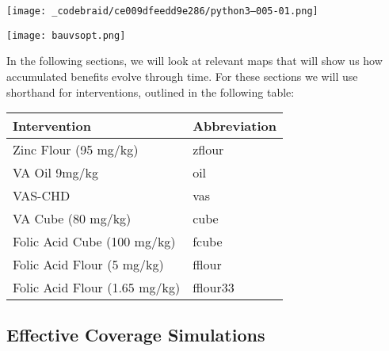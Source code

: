 \documentclass[
]{article}
\newenvironment{Shaded}{}{}
\newcommand{\DecValTok}[1]{\textcolor[rgb]{0.25,0.63,0.44}{#1}}
\newcommand{\FloatTok}[1]{\textcolor[rgb]{0.25,0.63,0.44}{#1}}
\newcommand{\NormalTok}[1]{#1}
\newcommand{\OperatorTok}[1]{\textcolor[rgb]{0.40,0.40,0.40}{#1}}
\newcommand{\StringTok}[1]{\textcolor[rgb]{0.25,0.44,0.63}{#1}}
\let\origfigure=\figure
\let\endorigfigure=\endfigure
\renewenvironment{figure}[1][]{%
    \origfigure[H]
}{%
    \endorigfigure
}
\begin{document}
\begin{Shaded}
\end{Shaded}

\texttt{[image: \_codebraid/ce009dfeedd9e286/python3--005-01.png]}

\begin{figure}
\hypertarget{fig:bau_comp}{%
\centering
\texttt{[image: bauvsopt.png]}
\caption{Cost per Benefit Comparison of BAU* vs.
Optimal}\label{fig:bau_comp}
}
\end{figure}

In the following sections, we will look at relevant maps that will show
us how accumulated benefits evolve through time. For these sections we
will use shorthand for interventions, outlined in the following table:

\begin{longtable}[]{@{}ll@{}}
\toprule
Intervention & Abbreviation\tabularnewline
\midrule
\endhead
Zinc Flour (95 mg/kg) & zflour\tabularnewline
VA Oil 9mg/kg & oil\tabularnewline
VAS-CHD & vas\tabularnewline
VA Cube (80 mg/kg) & cube\tabularnewline
Folic Acid Cube (100 mg/kg) & fcube\tabularnewline
Folic Acid Flour (5 mg/kg) & fflour\tabularnewline
Folic Acid Flour (1.65 mg/kg) & fflour33\tabularnewline
\bottomrule
\end{longtable}

\hypertarget{effective-coverage-simulations}{%
\subsection{Effective Coverage
Simulations}\label{effective-coverage-simulations}}
\end{document}
